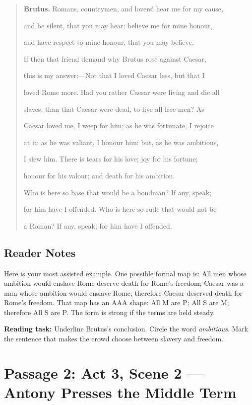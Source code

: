 \documentclass[12pt]{article}
\newenvironment{playpassage}{\begin{quote}\small\setlength{\parskip}{0.25em}}{\end{quote}}
\newcommand{\speaker}[1]{\textbf{#1.}}
\begin{document}
\begin{playpassage}
\speaker{Brutus} Romans, countrymen, and lovers! hear me for my cause,\par
and be silent, that you may hear: believe me for mine honour,\par
and have respect to mine honour, that you may believe.\par
If then that friend demand why Brutus rose against Caesar,\par
this is my answer:---Not that I loved Caesar less, but that I\par
loved Rome more. Had you rather Caesar were living and die all\par
slaves, than that Caesar were dead, to live all free men? As\par
Caesar loved me, I weep for him; as he was fortunate, I rejoice\par
at it; as he was valiant, I honour him: but, as he was ambitious,\par
I slew him. There is tears for his love; joy for his fortune;\par
honour for his valour; and death for his ambition.\par
Who is here so base that would be a bondman? If any, speak;\par
for him have I offended. Who is here so rude that would not be\par
a Roman? If any, speak; for him have I offended.
\end{playpassage}

\subsection*{Reader Notes}

Here is your most assisted example. One possible formal map is: All men whose ambition would enslave Rome deserve death for Rome's freedom; Caesar was a man whose ambition would enslave Rome; therefore Caesar deserved death for Rome's freedom. That map has an AAA shape: All M are P; All S are M; therefore All S are P. The form is strong if the terms are held steady.

\textbf{Reading task:} Underline Brutus's conclusion. Circle the word \textit{ambitious}. Mark the sentence that makes the crowd choose between slavery and freedom.

\newpage

\section*{Passage 2: Act 3, Scene 2 --- Antony Presses the Middle Term}
\end{document}
